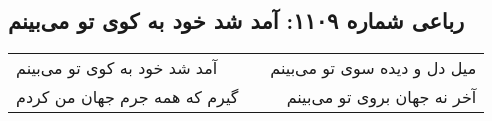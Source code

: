 \begin{center}
\section*{رباعی شماره ۱۱۰۹: آمد شد خود به کوی تو می‌بینم}
\label{sec:1109}
\begin{longtable}{l p{0.5cm} r}
آمد شد خود به کوی تو می‌بینم
&&
میل دل و دیده سوی تو می‌بینم
\\
گیرم که همه جرم جهان من کردم
&&
آخر نه جهان بروی تو می‌بینم
\\
\end{longtable}
\end{center}
